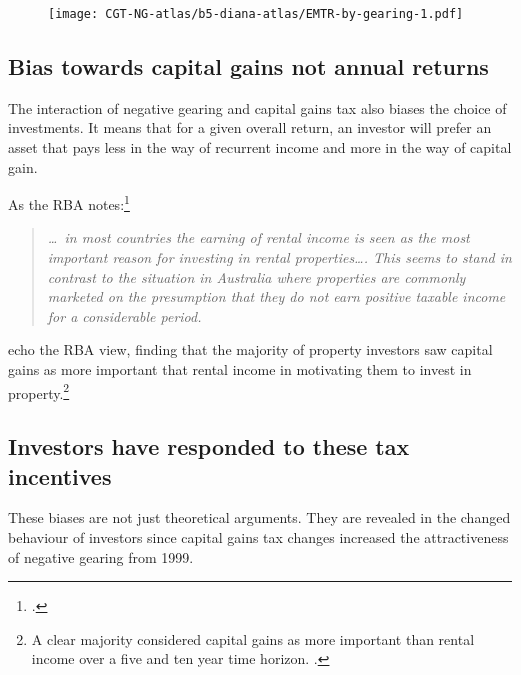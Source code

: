 \begin{figure}[!h]
\label{fig:EMTR-by-gearing}

\texttt{[image: CGT-NG-atlas/b5-diana-atlas/EMTR-by-gearing-1.pdf]}

\end{figure}

\subsection{Bias towards capital gains not annual returns}
The interaction of negative gearing and capital gains tax also biases the choice of investments. It means that for a given overall return, an investor will prefer an asset that pays less in the way of recurrent income and more in the way of capital gain.

As the RBA notes:\footcite[][42]{RBA2014SubmissionAffordableHousingInquiry}
\begin{quote}
\textit{\dots\ in most countries the earning of rental income is seen as the most important reason for investing in rental properties\dots. This seems to stand in contrast to the situation in Australia where properties are commonly marketed on the presumption that they do not earn positive taxable income for a considerable period.}
\end{quote}

\textcite{seelig2009understanding} echo the RBA view, finding that the majority of property investors saw capital gains as more important that rental income in motivating them to invest in property.\footnote{A clear majority considered capital gains as more important than rental income over a five and ten year time horizon. \textcite[][63]{seelig2009understanding}.}

\subsection{Investors have responded to these tax incentives}
These biases are not just theoretical arguments. 
They are revealed in the changed behaviour of investors since capital gains tax changes increased the attractiveness of negative gearing from 1999.

